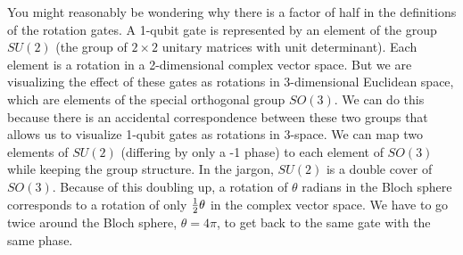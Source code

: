You might reasonably be wondering why there is a factor of half in the definitions of the rotation gates. A 1-qubit gate is represented by an element of the group $SU(2)$ (the group of $2\times2$ unitary matrices with unit determinant). Each element is a rotation in a 2-dimensional complex vector space. But we are visualizing the effect of these gates as rotations in 3-dimensional Euclidean space, which are elements of the special orthogonal group $SO(3)$. We can do this because there is an accidental correspondence between these two groups that allows us to visualize 1-qubit gates as rotations in 3-space. We can map two elements of $SU(2)$ (differing by only a -1 phase) to each element of $SO(3)$ while keeping the group structure. In the jargon, $SU(2)$ is a double cover of $SO(3)$. Because of this doubling up, a rotation of $\theta$ radians in the Bloch sphere corresponds to a rotation of only $\tfrac{1}{2} \theta$ in the complex vector space. We have to go twice around the Bloch sphere, $\theta =4\pi$, to get back to the same gate with the same phase.






%
%
%
%		 
%
%
%
%	 
%	 
%	 
%

